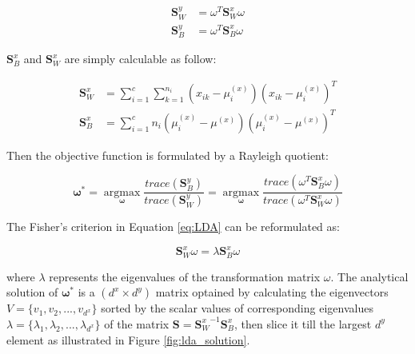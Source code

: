         \begin{align}
            \boldsymbol{S}_W^y &= \omega^T\boldsymbol{S}_W^x\omega\\
            \boldsymbol{S}_B^y &= \omega^T\boldsymbol{S}_B^x\omega
        \end{align}

        $\boldsymbol{S}_B^x$ and $\boldsymbol{S}_W^x$ are simply calculable as follow:

        \begin{align}
            \boldsymbol{S}_W^x &= \sum_{i=1}^{c}\sum_{k=1}^{n_{i}}(x_{ik}-\mu_i^{(x)})(x_{ik}-\mu_i^{(x)})^T \label{eq:LDA_Sw_x}\\
            \boldsymbol{S}_B^x &= \sum_{i=1}^{c}n_i(\mu_i^{(x)} - \mu^{(x)})(\mu_i^{(x)} - \mu^{(x)})^T \label{eq:LDA_Sb_x}
        \end{align}

        Then the objective function is formulated by a Rayleigh quotient:

        \begin{equation}
            \boldsymbol{\omega}^* = \operatorname*{argmax}_{\boldsymbol{\omega}}\frac{trace(\boldsymbol{S}_B^y)}{trace(\boldsymbol{S}_W^y)} = \operatorname*{argmax}_{\boldsymbol{\omega}}\frac{trace(\omega^T\boldsymbol{S}_B^x\omega)}{trace(\omega^T\boldsymbol{S}_W^x\omega)}
            \label{eq:LDA}
        \end{equation}

        The Fisher's criterion in Equation \eqref{eq:LDA} can be reformulated as:

        \begin{equation}
            \boldsymbol{S}_W^x\omega = \lambda\boldsymbol{S}_B^x\omega
        \end{equation}

        where $\lambda$ represents the eigenvalues of the transformation matrix $\omega$. The analytical solution of $\boldsymbol{\omega}^*$ is a $(d^x \times d^y)$ matrix optained by calculating the eigenvectors $V = \{v_1,v_2,...,v_{d^x}\}$ sorted by the scalar values of corresponding eigenvalues $\lambda = \{\lambda_1,\lambda_2,...,\lambda_{d^x}\}$ of the matrix $\boldsymbol{S} = {\boldsymbol{S}_W^x}^{-1}\boldsymbol{S}_B^x$, then slice it till the largest $d^y$ element as illustrated in Figure \ref{fig:lda_solution}.

